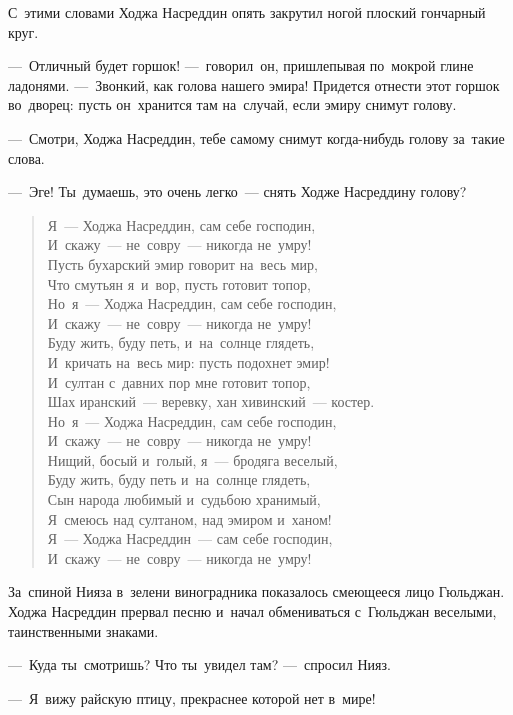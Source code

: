 \documentclass[12pt,a4paper]{book}
\begin{document}
С~этими словами Ходжа Насреддин опять закрутил ногой плоский гончарный круг.

—~Отличный будет горшок! —~говорил~он, пришлепывая по~мокрой глине ладонями. —~Звонкий, как голова нашего эмира! Придется отнести этот горшок во~дворец: пусть он~хранится там на~случай, если эмиру снимут голову.

—~Смотри, Ходжа Насреддин, тебе самому снимут когда-нибудь голову за~такие слова.

—~Эге! Ты~думаешь, это очень легко~— снять Ходже Насреддину голову?

\begin{verse}
Я~— Ходжа Насреддин, сам себе господин, \\
И~скажу~— не~совру~— никогда не~умру! \\
Пусть бухарский эмир говорит на~весь мир, \\
Что смутьян я~и~вор, пусть готовит топор, \\
Но~я~— Ходжа Насреддин, сам себе господин, \\
И~скажу~— не~совру~— никогда не~умру! \\
Буду жить, буду петь, и~на~солнце глядеть, \\
И~кричать на~весь мир: пусть подохнет эмир! \\
И~султан с~давних пор мне готовит топор, \\
Шах иранский~— веревку, хан хивинский~— костер. \\
Но~я~— Ходжа Насреддин, сам себе господин, \\
И~скажу~— не~совру~— никогда не~умру! \\
Нищий, босый и~голый, я~— бродяга веселый, \\
Буду жить, буду петь и~на~солнце глядеть, \\
Сын народа любимый и~судьбою хранимый, \\
Я~смеюсь над султаном, над эмиром и~ханом! \\
Я~— Ходжа Насреддин~— сам себе господин, \\
И~скажу~— не~совру~— никогда не~умру!
\end{verse}

За~спиной Нияза в~зелени виноградника показалось смеющееся лицо Гюльджан. Ходжа Насреддин прервал песню и~начал обмениваться с~Гюльджан веселыми, таинственными знаками.

—~Куда ты~смотришь? Что ты~увидел там? —~спросил Нияз.

—~Я~вижу райскую птицу, прекраснее которой нет в~мире!
\end{document}
